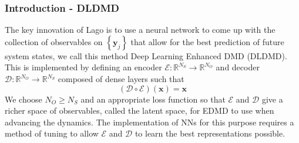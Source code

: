 \documentclass[11pt,aspectratio=169]{beamer}
\newcommand{\norm}[1]{\left|\left|#1\right|\right|}
\newcommand{\parens}[1]{\left(#1\right)}
\newcommand{\bracks}[1]{\left\{#1\right\}}
\newcommand{\R}{\mathbb{R}}
\begin{document}
    \begin{frame}
        \frametitle{Introduction - DLDMD}
        The key innovation of Lago
        \cite{lago} is to use a neural network to come up with the collection of 
        observables on $\bracks{\boldsymbol{y}_j}$ that allow for the best prediction 
        of future system states, we call this method Deep Learning Enhanced DMD (DLDMD). 
        This is implemented by defining an encoder 
        $\mathcal{E}: \R^{N_S} \to \R^{N_O}$ and decoder $\mathcal{D}: \R^{N_O} \to \R^{N_S}$ composed of 
        dense layers such that 
        \begin{equation}
            (\mathcal{D}\circ\mathcal{E})(\boldsymbol{x}) = \boldsymbol{x}
        \end{equation}
        We choose $N_O \geq N_S$ and an appropriate loss function so that 
        $\mathcal{E}$ and $\mathcal{D}$ give a richer space of observables, called the 
        latent space, for EDMD to use when advancing the dynamics. The implementation 
        of NNs for this purpose requires a method of tuning to allow $\mathcal{E}$ and 
        $\mathcal{D}$ to learn the best representations possible. 
    \end{frame}
    
\end{document}
